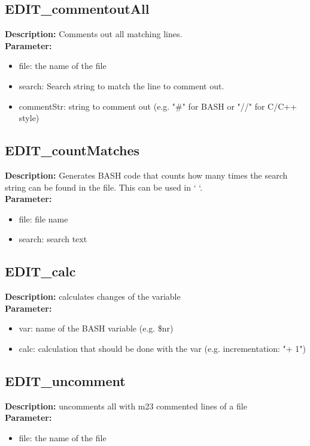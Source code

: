 \subsection{EDIT\_commentoutAll}
\textbf{Description:} Comments out all matching lines.\\
\textbf{Parameter:}
\begin{itemize}
\item file: the name of the file
\item search: Search string to match the line to comment out.
\item commentStr: string to comment out (e.g. "\#" for BASH or "//" for C/C++ style)
\end{itemize}

\subsection{EDIT\_countMatches}
\textbf{Description:} Generates BASH code that counts how many times the search string can be found in the file. This can be used in ` `.\\
\textbf{Parameter:}
\begin{itemize}
\item file: file name
\item search: search text
\end{itemize}

\subsection{EDIT\_calc}
\textbf{Description:} calculates changes of the variable\\
\textbf{Parameter:}
\begin{itemize}
\item var: name of the BASH variable (e.g. \$nr)
\item calc: calculation that should be done with the var (e.g. incrementation: "+ 1")
\end{itemize}

\subsection{EDIT\_uncomment}
\textbf{Description:} uncomments all with m23 commented lines of a file\\
\textbf{Parameter:}
\begin{itemize}
\item file: the name of the file
\end{itemize}

